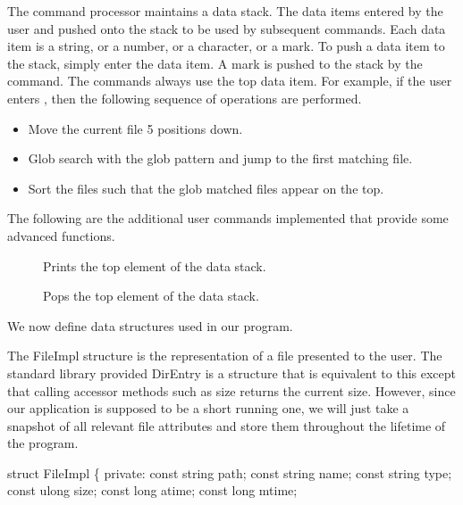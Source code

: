 The command processor maintains a data stack. The data items entered
by the user and pushed onto the stack to be used by subsequent
commands. Each data item is a string, or a number, or a character, or
a mark. To push a data item to the stack, simply enter the data
item. A mark is pushed to the stack by the  command. The
commands always use the top data item. For example, if the user enters
, then the following sequence of operations
are performed.

\begin{itemize}

\item Move the current file 5 positions down.

\item Glob search with the glob pattern  and jump to the
first matching file.

\item Sort the files such that the glob matched files appear on the
top.

\end{itemize}

The following are the additional user commands implemented that
provide some advanced functions.

\begin{description}

\item [] Prints the top element of the data stack.

\item [] Pops the top element of the data stack.

\end{description}

We now define data structures used in our program.

The {\Tt{}FileImpl\nwendquote} structure is the representation of a file presented
to the user. The standard library provided {\Tt{}DirEntry\nwendquote} is a structure
that is equivalent to this except that calling accessor methods such
as {\Tt{}size\nwendquote} returns the current size. However, since our application
is supposed to be a short running one, we will just take a snapshot of
all relevant file attributes and store them throughout the lifetime of
the program.

\nwenddocs{}\endmoddef\nwstartdeflinemarkup\nwenddeflinemarkup
struct FileImpl
\{
  private:
  const string path;
  const string name;
  const string type;
  const ulong  size;
  const long   atime;
  const long   mtime;

